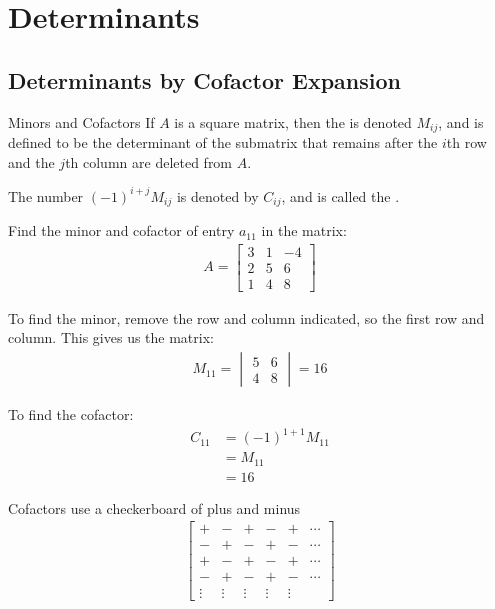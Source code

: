 \documentclass[\main/notes.tex]{subfiles}
\begin{document}
	\setcounter{chapter}{1}
	\chapter{Determinants}
		\section{Determinants by Cofactor Expansion}
			\begin{definition}{Minors and Cofactors}
				If $A$ is a square matrix, then the  is denoted $M_{ij}$, and is defined to be the determinant of the submatrix that remains after the $i$th row and the $j$th column are deleted from $A$.

				The number $(-1)^{i + j}M_{ij}$ is denoted by $C_{ij}$, and is called the .
			\end{definition}
			\begin{example}
				Find the minor and cofactor of entry $a_{11}$ in the matrix:
				\begin{align*}
					A = \begin{bmatrix}
						3 & 1 & -4\\
						2 & 5 & 6\\
						1 & 4 & 8
					\end{bmatrix}
				\end{align*}

				To find the minor, remove the row and column indicated, so the first row and column. This gives us the matrix:
				\begin{align*}
					M_{11} = \begin{vmatrix}
						5 & 6\\
						4 & 8
					\end{vmatrix} = 16
				\end{align*}

				To find the cofactor:
				\begin{align*}
					C_{11} &= (-1)^{1 + 1}M_{11}\\
					&= M_{11}\\
					&= 16
				\end{align*}
			\end{example}
			\begin{sidenote}{Cofactors use a checkerboard of plus and minus}
				\begin{align*}
					\begin{bmatrix}
						+ & - & + & - & + & \cdots\\
						- & + & - & + & - & \cdots\\
						+ & - & + & - & + & \cdots\\
						- & + & - & + & - & \cdots\\
						\vdots & \vdots & \vdots & \vdots & \vdots
					\end{bmatrix}
				\end{align*}
			\end{sidenote}
\end{document}
